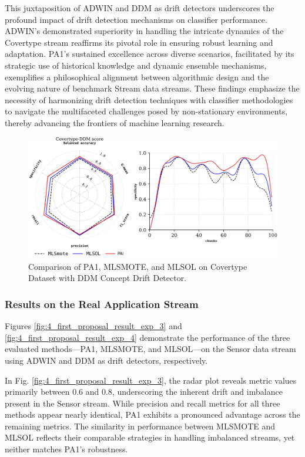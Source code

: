 This juxtaposition of ADWIN and DDM as drift detectors underscores the profound impact of drift detection mechanisms on classifier performance. ADWIN’s demonstrated superiority in handling the intricate dynamics of the Covertype stream reaffirms its pivotal role in ensuring robust learning and adaptation. PA1’s sustained excellence across diverse scenarios, facilitated by its strategic use of historical knowledge and dynamic ensemble mechanisms, exemplifies a philosophical alignment between algorithmic design and the evolving nature of benchmark Stream data streams. These findings emphasize the necessity of harmonizing drift detection techniques with classifier methodologies to navigate the multifaceted challenges posed by non-stationary environments, thereby advancing the frontiers of machine learning research.

\vspace{-2mm}
\begin{figure}[H]
	\centering
	\includegraphics[width=1\linewidth]{4_Imbalanced/figures/exp_2.png}
  \caption{Comparison of PA1, MLSMOTE, and MLSOL on Covertype Dataset with DDM Concept Drift Detector.}
	\label{fig:4_first_proposal_result_exp_2}
\end{figure}

\subsubsection{Results on the Real Application Stream}
Figures \ref{fig:4_first_proposal_result_exp_3} and \ref{fig:4_first_proposal_result_exp_4} demonstrate the performance of the three evaluated methods—PA1, MLSMOTE, and MLSOL—on the Sensor data stream using ADWIN and DDM as drift detectors, respectively.

In Fig. \ref{fig:4_first_proposal_result_exp_3}, the radar plot reveals metric values primarily between 0.6 and 0.8, underscoring the inherent drift and imbalance present in the Sensor stream. While precision and recall metrics for all three methods appear nearly identical, PA1 exhibits a pronounced advantage across the remaining metrics. The similarity in performance between MLSMOTE and MLSOL reflects their comparable strategies in handling imbalanced streams, yet neither matches PA1's robustness.

